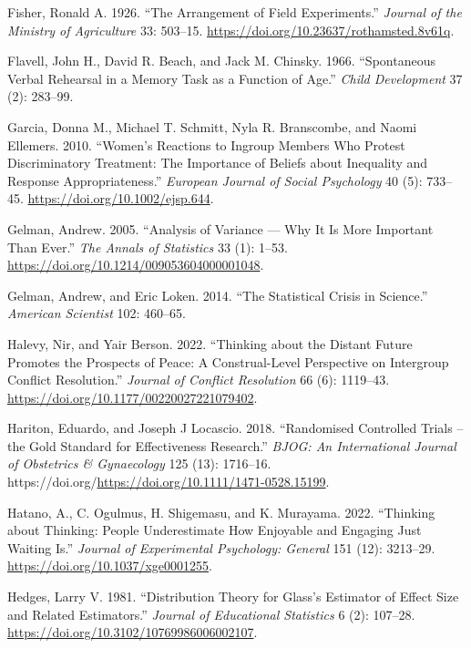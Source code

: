 \documentclass[
  11pt,
  letterpaper,
]{scrbook}
\newlength{\cslhangindent}
\newenvironment{CSLReferences}[2] %
 {\begin{list}{}{%
  \setlength{\itemindent}{0pt}
  \setlength{\leftmargin}{0pt}
  \setlength{\parsep}{0pt}
  \ifodd #1
   \setlength{\leftmargin}{\cslhangindent}
   \setlength{\itemindent}{-1\cslhangindent}
  \fi
  \setlength{\itemsep}{#2\baselineskip}}}
 {\end{list}}
\theoremstyle{definition}
\theoremstyle{definition}
\theoremstyle{remark}
\begin{document}
\begin{CSLReferences}{1}{0}
Fisher, Ronald A. 1926. {``The Arrangement of Field Experiments.''}
\emph{Journal of the Ministry of Agriculture} 33: 503--15.
\url{https://doi.org/10.23637/rothamsted.8v61q}.

Flavell, John H., David R. Beach, and Jack M. Chinsky. 1966.
{``Spontaneous Verbal Rehearsal in a Memory Task as a Function of
Age.''} \emph{Child Development} 37 (2): 283--99.

Garcia, Donna M., Michael T. Schmitt, Nyla R. Branscombe, and Naomi
Ellemers. 2010. {``Women's Reactions to Ingroup Members Who Protest
Discriminatory Treatment: The Importance of Beliefs about Inequality and
Response Appropriateness.''} \emph{European Journal of Social
Psychology} 40 (5): 733--45. \url{https://doi.org/10.1002/ejsp.644}.

Gelman, Andrew. 2005. {``Analysis of Variance --- Why It Is More
Important Than Ever.''} \emph{The Annals of Statistics} 33 (1): 1--53.
\url{https://doi.org/10.1214/009053604000001048}.

Gelman, Andrew, and Eric Loken. 2014. {``The Statistical Crisis in
Science.''} \emph{American Scientist} 102: 460--65.

Halevy, Nir, and Yair Berson. 2022. {``Thinking about the Distant Future
Promotes the Prospects of Peace: A Construal-Level Perspective on
Intergroup Conflict Resolution.''} \emph{Journal of Conflict Resolution}
66 (6): 1119--43. \url{https://doi.org/10.1177/00220027221079402}.

Hariton, Eduardo, and Joseph J Locascio. 2018. {``Randomised Controlled
Trials -- the Gold Standard for Effectiveness Research.''} \emph{BJOG:
An International Journal of Obstetrics \& Gynaecology} 125 (13):
1716--16. https://doi.org/\url{https://doi.org/10.1111/1471-0528.15199}.

Hatano, A., C. Ogulmus, H. Shigemasu, and K. Murayama. 2022. {``Thinking
about Thinking: People Underestimate How Enjoyable and Engaging Just
Waiting Is.''} \emph{Journal of Experimental Psychology: General} 151
(12): 3213--29. \url{https://doi.org/10.1037/xge0001255}.

Hedges, Larry V. 1981. {``Distribution Theory for {G}lass's Estimator of
Effect Size and Related Estimators.''} \emph{Journal of Educational
Statistics} 6 (2): 107--28.
\url{https://doi.org/10.3102/10769986006002107}.


\end{CSLReferences}
\end{document}
